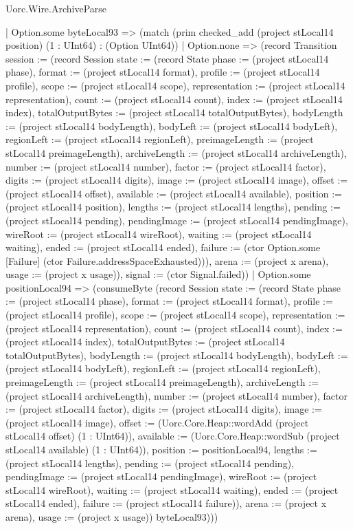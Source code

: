 \begin{lexlean}{Uorc.Wire.ArchiveParse}
\begin{semanticmodule}
{              | Option.some byteLocal93 => (match (prim checked_add (project stLocal14 position) (1 : UInt64) : (Option UInt64))
                | Option.none => (record Transition {session := (record Session {state := (record State {phase := (project stLocal14 phase), format := (project stLocal14 format), profile := (project stLocal14 profile), scope := (project stLocal14 scope), representation := (project stLocal14 representation), count := (project stLocal14 count), index := (project stLocal14 index), totalOutputBytes := (project stLocal14 totalOutputBytes), bodyLength := (project stLocal14 bodyLength), bodyLeft := (project stLocal14 bodyLeft), regionLeft := (project stLocal14 regionLeft), preimageLength := (project stLocal14 preimageLength), archiveLength := (project stLocal14 archiveLength), number := (project stLocal14 number), factor := (project stLocal14 factor), digits := (project stLocal14 digits), image := (project stLocal14 image), offset := (project stLocal14 offset), available := (project stLocal14 available), position := (project stLocal14 position), lengths := (project stLocal14 lengths), pending := (project stLocal14 pending), pendingImage := (project stLocal14 pendingImage), wireRoot := (project stLocal14 wireRoot), waiting := (project stLocal14 waiting), ended := (project stLocal14 ended), failure := (ctor Option.some [Failure] (ctor Failure.addressSpaceExhausted))}), arena := (project x arena), usage := (project x usage)}), signal := (ctor Signal.failed)})
                | Option.some positionLocal94 => (consumeByte (record Session {state := (record State {phase := (project stLocal14 phase), format := (project stLocal14 format), profile := (project stLocal14 profile), scope := (project stLocal14 scope), representation := (project stLocal14 representation), count := (project stLocal14 count), index := (project stLocal14 index), totalOutputBytes := (project stLocal14 totalOutputBytes), bodyLength := (project stLocal14 bodyLength), bodyLeft := (project stLocal14 bodyLeft), regionLeft := (project stLocal14 regionLeft), preimageLength := (project stLocal14 preimageLength), archiveLength := (project stLocal14 archiveLength), number := (project stLocal14 number), factor := (project stLocal14 factor), digits := (project stLocal14 digits), image := (project stLocal14 image), offset := (Uorc.Core.Heap::wordAdd (project stLocal14 offset) (1 : UInt64)), available := (Uorc.Core.Heap::wordSub (project stLocal14 available) (1 : UInt64)), position := positionLocal94, lengths := (project stLocal14 lengths), pending := (project stLocal14 pending), pendingImage := (project stLocal14 pendingImage), wireRoot := (project stLocal14 wireRoot), waiting := (project stLocal14 waiting), ended := (project stLocal14 ended), failure := (project stLocal14 failure)}), arena := (project x arena), usage := (project x usage)}) byteLocal93)))
}
\end{semanticmodule}
\end{lexlean}
